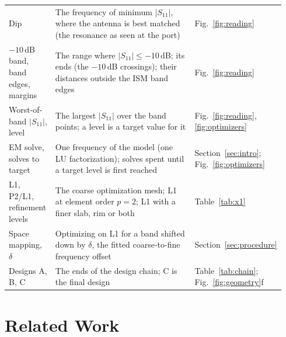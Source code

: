 \documentclass{anvil-paper}
\newcommand{\PL}{P2/L1}
\begin{document}
\begin{table}[t]
\begin{tabular}{@{}>{\raggedright\arraybackslash}p{0.17\linewidth}>{\raggedright\arraybackslash}p{0.62\linewidth}>{\raggedright\arraybackslash}p{0.15\linewidth}@{}}
    Dip & The frequency of minimum $|S_{11}|$, where the antenna is best matched (the resonance as seen at the port) & Fig.~\ref{fig:reading} \\
    $-10$\,dB band, band edges, margins & The range where $|S_{11}| \le -10$\,dB; its ends (the $-10$\,dB crossings); their distances outside the ISM band edges & Fig.~\ref{fig:reading} \\
    Worst-of-band $|S_{11}|$, level & The largest $|S_{11}|$ over the band points; a level is a target value for it & Fig.~\ref{fig:reading}, \ref{fig:optimizers} \\
    EM solve, solves to target & One frequency of the model (one LU factorization); solves spent until a target level is first reached & Section~\ref{sec:intro}; Fig.~\ref{fig:optimizers} \\
    L1, \PL, refinement levels & The coarse optimization mesh; L1 at element order $p = 2$; L1 with a finer slab, rim or both & Table~\ref{tab:x1} \\
    Space mapping, $\delta$ & Optimizing on L1 for a band shifted down by $\delta$, the fitted coarse-to-fine frequency offset & Section~\ref{sec:procedure} \\
    Designs A, B, C & The ends of the design chain; C is the final design & Table~\ref{tab:chain}; Fig.~\ref{fig:geometry}f \\
    \bottomrule
  \end{tabular}
\end{table}

\section{Related Work}
\label{sec:related}
\end{document}
